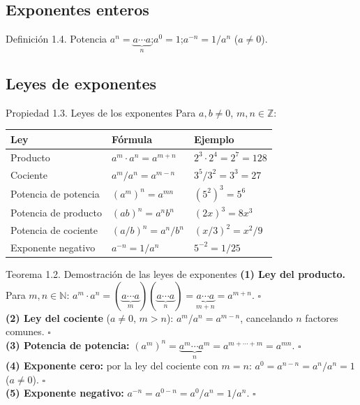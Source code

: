 \documentclass[12pt,letterpaper]{book}
\begin{document}
\subsection{Exponentes enteros}

\begin{defbox}{Definición 1.4. Potencia}
$a^n = \underbrace{a\cdots a}_{n}$;\quad $a^0=1$;\quad $a^{-n}=1/a^n$ ($a\neq0$).
\end{defbox}

\subsection{Leyes de exponentes}

\begin{propbox}{Propiedad 1.3. Leyes de los exponentes}
Para $a,b\neq0$, $m,n\in\mathbb{Z}$:
\begin{center}
\begin{tabular}{lll}
\textbf{Ley} & \textbf{Fórmula} & \textbf{Ejemplo}\\\hline
Producto & $a^m\cdot a^n=a^{m+n}$ & $2^3\cdot2^4=2^7=128$\\
Cociente & $a^m/a^n=a^{m-n}$ & $3^5/3^2=3^3=27$\\
Potencia de potencia & $(a^m)^n=a^{mn}$ & $(5^2)^3=5^6$\\
Potencia de producto & $(ab)^n=a^nb^n$ & $(2x)^3=8x^3$\\
Potencia de cociente & $(a/b)^n=a^n/b^n$ & $(x/3)^2=x^2/9$\\
Exponente negativo & $a^{-n}=1/a^n$ & $5^{-2}=1/25$
\end{tabular}
\end{center}
\end{propbox}

\begin{thmbox}{Teorema 1.2. Demostración de las leyes de exponentes}
\textbf{(1) Ley del producto.} Para $m,n\in\mathbb{N}$: $a^m\cdot a^n=(\underbrace{a\cdots a}_m)(\underbrace{a\cdots a}_n)=\underbrace{a\cdots a}_{m+n}=a^{m+n}$. $\square$\\[4pt]
\textbf{(2) Ley del cociente} ($a\neq0,\,m>n$): $a^m/a^n=a^{m-n}$, cancelando $n$ factores comunes. $\square$\\[4pt]
\textbf{(3) Potencia de potencia:} $(a^m)^n=\underbrace{a^m\cdots a^m}_{n}=a^{m+\cdots+m}=a^{mn}$. $\square$\\[4pt]
\textbf{(4) Exponente cero:} por la ley del cociente con $m=n$: $a^0=a^{n-n}=a^n/a^n=1$ ($a\neq0$). $\square$\\[4pt]
\textbf{(5) Exponente negativo:} $a^{-n}=a^{0-n}=a^0/a^n=1/a^n$. $\square$
\end{thmbox}
\end{document}

